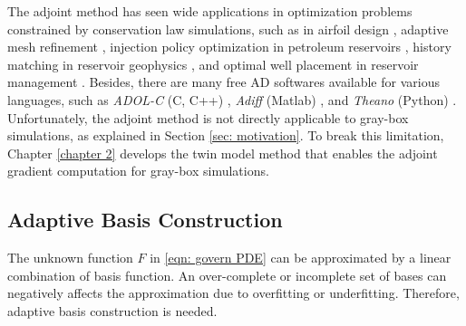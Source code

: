 The adjoint method has seen wide applications in optimization problems constrained by 
conservation law simulations, such as in
airfoil design \cite{adjoint aerodynamics, adjoint aerodynamics 2, 
adjoint aerodynamics AD}, adaptive mesh refinement
\cite{discrete adjoint phd}, injection policy optimization in petroleum reservoirs
\cite{adjoint reservoir optimal control}, 
history matching in reservoir geophysics
\cite{review adjoint geo}, and optimal well placement in reservoir management 
\cite{adjoint well place}.
Besides, there are many free AD softwares available for various languages, such as
\emph{ADOL-C} (C, C++) \cite{adolc}, \emph{Adiff} (Matlab) \cite{adiff}, and \emph{Theano} (Python)
\cite{theano}.
Unfortunately, the adjoint method is not directly applicable
to gray-box simulations, as explained in Section \ref{sec: motivation}. 
To break this limitation, Chapter \ref{chapter 2} develops the twin model method
that enables the adjoint gradient computation for gray-box simulations.\\


\subsection{Adaptive Basis Construction}
\label{sec: adaptive basis review}

The unknown function $F$ in \eqref{eqn: govern PDE} can be approximated by a linear
combination of basis function. An over-complete or
incomplete set of bases can negatively affects the approximation due to overfitting or underfitting.
Therefore, adaptive basis construction is needed.\\

